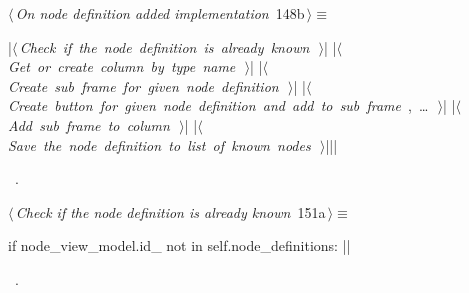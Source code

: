 \documentclass[%
    a4paper,    %
    justified,  %
    nobib,      %
    openany     %
]{tufte-book}
\begin{document}
\begin{flushleft} \small
\begin{minipage}{\linewidth}\label{scrap154}\raggedright\small
{} $\langle\,${\itshape On node definition added implementation}\nobreak\ {\footnotesize {148b}}$\,\rangle\equiv$
\vspace{-1ex}
\begin{pythoncode}
|\hbox{$\langle\,${\itshape Check if the node definition is already known}\nobreak\ {\footnotesize {}}$\,\rangle$}|
|\hbox{$\langle\,${\itshape Get or create column by type name}\nobreak\ {\footnotesize {}}$\,\rangle$}|
|\hbox{$\langle\,${\itshape Create sub frame for given node definition}\nobreak\ {\footnotesize {}}$\,\rangle$}|
|\hbox{$\langle\,${\itshape Create button for given node definition and add to sub frame}\nobreak\ {\footnotesize {}, \ldots\ }$\,\rangle$}|
|\hbox{$\langle\,${\itshape Add sub frame to column}\nobreak\ {\footnotesize {}}$\,\rangle$}|
|\hbox{$\langle\,${\itshape Save the node definition to list of known nodes}\nobreak\ {\footnotesize {}}$\,\rangle$}||\NWsep|
\end{pythoncode}
\vspace{1.5ex}
\footnotesize
\begin{list}{}{\setlength{\itemsep}{-\parsep}\setlength{\itemindent}{-\leftmargin}}
\item \NWtxtMacroRefIn\ .

\item{}
\end{list}
\end{minipage}\vspace{4ex}
\end{flushleft}
%
\begin{flushleft} \small
\begin{minipage}{\linewidth}\label{scrap155}\raggedright\small
{} $\langle\,${\itshape Check if the node definition is already known}\nobreak\ {\footnotesize {151a}}$\,\rangle\equiv$
\vspace{-1ex}
\begin{pythoncode}
if node_view_model.id_ not in self.node_definitions:
|\NWsep|
\end{pythoncode}
\vspace{1.5ex}
\footnotesize
\begin{list}{}{\setlength{\itemsep}{-\parsep}\setlength{\itemindent}{-\leftmargin}}
\item \NWtxtMacroRefIn\ .

\item{}
\end{list}
\end{minipage}\vspace{4ex}
\end{flushleft}
\end{document}
